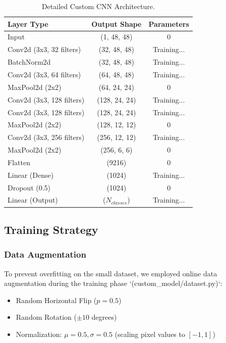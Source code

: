 \documentclass[a4paper,12pt]{article}
\begin{document}
\begin{table}[H]
\centering
\begin{tabular}{lcc}
\toprule
\textbf{Layer Type} & \textbf{Output Shape} & \textbf{Parameters} \\
\midrule
Input & (1, 48, 48) & 0 \\
Conv2d (3x3, 32 filters) & (32, 48, 48) & Training... \\
BatchNorm2d & (32, 48, 48) & Training... \\
Conv2d (3x3, 64 filters) & (64, 48, 48) & Training... \\
MaxPool2d (2x2) & (64, 24, 24) & 0 \\
\midrule
Conv2d (3x3, 128 filters) & (128, 24, 24) & Training... \\
Conv2d (3x3, 128 filters) & (128, 24, 24) & Training... \\
MaxPool2d (2x2) & (128, 12, 12) & 0 \\
\midrule
Conv2d (3x3, 256 filters) & (256, 12, 12) & Training... \\
MaxPool2d (2x2) & (256, 6, 6) & 0 \\
\midrule
Flatten & (9216) & 0 \\
Linear (Dense) & (1024) & Training... \\
Dropout (0.5) & (1024) & 0 \\
Linear (Output) & ($N_{classes}$) & Training... \\
\bottomrule
\end{tabular}
\caption{Detailed Custom CNN Architecture.}
\label{tab:arch}
\end{table}

\subsection{Training Strategy}
\subsubsection{Data Augmentation}
To prevent overfitting on the small dataset, we employed online data augmentation during the training phase `(custom\_model/dataset.py)`:
\begin{itemize}
    \item Random Horizontal Flip ($p=0.5$)
    \item Random Rotation ($\pm 10$ degrees)
    \item Normalization: $\mu=0.5, \sigma=0.5$ (scaling pixel values to $[-1, 1]$)
\end{itemize}
\end{document}
